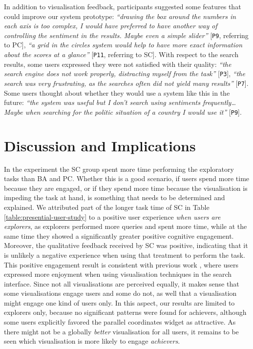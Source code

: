 \documentclass{sig-alternate}
\newcommand{\spara}[1]{\smallskip\noindent{\bf #1}}
\begin{document}
In addition to visualisation feedback, participants suggested some features that could improve our system prototype: 
\emph{``drawing the box around the numbers in each axis is too complex, I would have preferred to have another way of controlling the sentiment in the results. Maybe even a simple slider''} [\texttt{P9}, referring to PC], \emph{``a grid in the circles system would help to have more exact information about the scores at a glance''} [\texttt{P11}, referring to SC]. 
With respect to the search results, some users expressed they were not satisfied with their quality: 
\emph{``the search engine does not work properly, distracting myself from the task''} [\texttt{P3}],
\emph{``the search was very frustrating, as the searches often did not yield many results''} [\texttt{P7}].
Some users thought about whether they would use a system like this in the future:
\emph{``the system was useful but I don't search using sentiments frequently\ldots Maybe when searching for the politic situation of a country I would use it''} [\texttt{P9}]. 


\section{Discussion and Implications}
\spara{User Engagement and Visualisation Widgets.}
In the experiment the SC group spent more time performing the exploratory tasks than BA and PC. 
Whether this is a good scenario, if users spend more time because they are engaged, or if they spend more time because the visualisation is impeding the task at hand, is something that needs to be determined and explained.
We attributed part of the longer task time of SC in Table \ref{table:presential-user-study} to a positive user experience \emph{when users are explorers}, as explorers performed more queries and spent more time, while at the same time they showed a significantly greater positive cognitive engagement.
Moreover, the qualitative feedback received by SC was positive, indicating that it is unlikely a negative experience when using that treatment to perform the task.
This positive engagement result is consistent with previous work \cite{clarkson2009resultmaps}, where users expressed more enjoyment when using visualisation techniques in the search interface.
Since not all visualisations are perceived equally, it makes sense that some visualisations engage users and some do not, as well that a visualisation might engage one kind of users only.
In this aspect, our results are limited to explorers only, because no significant patterns were found for achievers, although some users explicitly favored the parallel coordinates widget as attractive. 
As there might not be a globally \emph{better} visualisation for all users, it remains to be seen which visualisation is more likely to engage \textit{achievers}.
\end{document}
